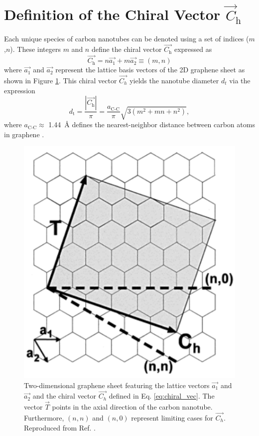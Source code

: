 \section{Definition of the Chiral Vector $\vec{C}_\text{h}$}

Each unique species of carbon nanotubes can be denoted using a set of indices ($m$,$n$). These integers $m$ and $n$ define the chiral vector $\vec{C_\text{h} }$ expressed as 
\begin{equation}
	\vec{C_\text{h}} = n {\vec{a_\text{1}}} + m {\vec{a_2}} \equiv (m,n)
	\label{eq:chiral_vec}
\end{equation}
where $\vec{a_\text{1}}$ and $\vec{a_\text{2}}$ represent the lattice basis vectors of the 2D graphene sheet as shown in Figure \ref{fig:chiral_vectors}. This chiral vector $\vec{C_h}$ yields the nanotube diameter $d_t$ via the expression
\begin{equation}
	d_\text{t} = \dfrac{|\vec{C_\text{h}}|}{\pi} = \dfrac{a_\text{C-C}}{\pi}\sqrt{3(m^2 + mn + n^2)},
\end{equation} 
where $a_\text{C-C} \approx$ \SI{1.44}{\angstrom} defines the nearest-neighbor distance between carbon atoms in graphene \cite{nanot2013single}.  

\begin{figure}[ht]
	\centering
	\includegraphics[scale=1]{images/chapter_optical_props/chiral_vectors_sheet.png}
	\caption{Two-dimensional graphene sheet featuring the lattice vectors $\vec{a_1}$ and $\vec{a_2}$ and the chiral vector $\vec{C_h}$ defined in Eq. \ref{eq:chiral_vec}. The vector $\vec{T}$ points in the axial direction of the carbon nanotube. Furthermore, $(n,n)$ and $(n,0)$ represent limiting cases for $\vec{C_h }$. Reproduced from Ref. \cite{odom2000structure}.}
	\label{fig:chiral_vectors}
\end{figure}


